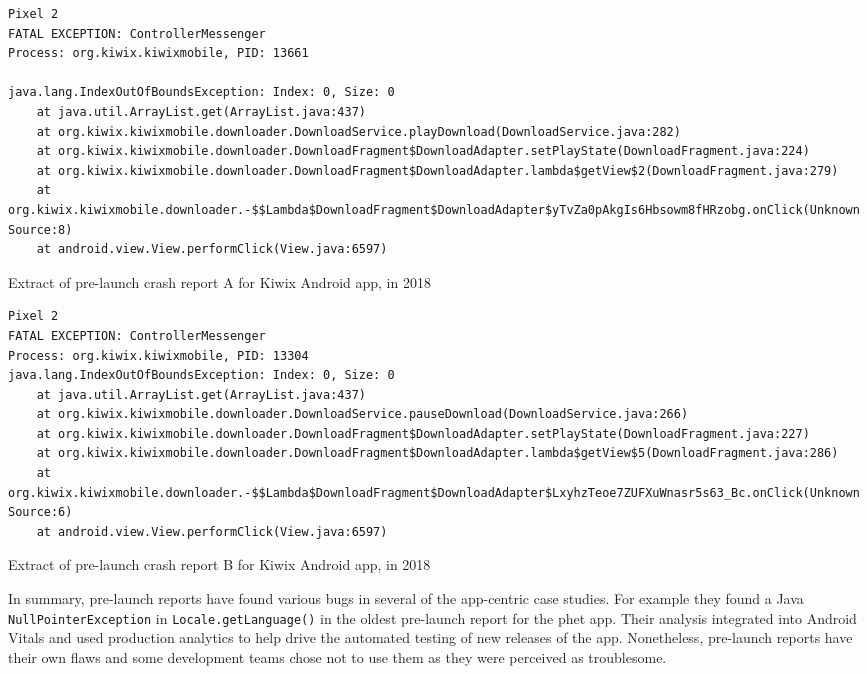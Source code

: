 \begin{listing}
\begin{verbatim}
Pixel 2
FATAL EXCEPTION: ControllerMessenger
Process: org.kiwix.kiwixmobile, PID: 13661

java.lang.IndexOutOfBoundsException: Index: 0, Size: 0
	at java.util.ArrayList.get(ArrayList.java:437)
	at org.kiwix.kiwixmobile.downloader.DownloadService.playDownload(DownloadService.java:282)
	at org.kiwix.kiwixmobile.downloader.DownloadFragment$DownloadAdapter.setPlayState(DownloadFragment.java:224)
	at org.kiwix.kiwixmobile.downloader.DownloadFragment$DownloadAdapter.lambda$getView$2(DownloadFragment.java:279)
	at org.kiwix.kiwixmobile.downloader.-$$Lambda$DownloadFragment$DownloadAdapter$yTvZa0pAkgIs6Hbsowm8fHRzobg.onClick(Unknown Source:8)
	at android.view.View.performClick(View.java:6597)

\end{verbatim}
\caption{Extract of pre-launch crash report A for Kiwix Android app, in 2018}
\label{listing:kiwix-pre-launch-report-crash-report-a}
\end{listing}


\begin{listing}
\begin{verbatim}
Pixel 2
FATAL EXCEPTION: ControllerMessenger
Process: org.kiwix.kiwixmobile, PID: 13304
java.lang.IndexOutOfBoundsException: Index: 0, Size: 0
	at java.util.ArrayList.get(ArrayList.java:437)
	at org.kiwix.kiwixmobile.downloader.DownloadService.pauseDownload(DownloadService.java:266)
	at org.kiwix.kiwixmobile.downloader.DownloadFragment$DownloadAdapter.setPlayState(DownloadFragment.java:227)
	at org.kiwix.kiwixmobile.downloader.DownloadFragment$DownloadAdapter.lambda$getView$5(DownloadFragment.java:286)
	at org.kiwix.kiwixmobile.downloader.-$$Lambda$DownloadFragment$DownloadAdapter$LxyhzTeoe7ZUFXuWnasr5s63_Bc.onClick(Unknown Source:6)
	at android.view.View.performClick(View.java:6597)
\end{verbatim}
\caption{Extract of pre-launch crash report B for Kiwix Android app, in 2018}
\label{listing:kiwix-pre-launch-report-crash-report-b}
\end{listing}

In summary, pre-launch reports have found various bugs in several of the app-centric case studies. For example they found a Java \texttt{NullPointerException} in \texttt{Locale.getLanguage()} in the oldest pre-launch report for the \gls{phet} app. Their analysis integrated into Android Vitals and used production analytics to help drive the automated testing of new releases of the app. Nonetheless, pre-launch reports have their own flaws and some development teams chose not to use them as they were perceived as troublesome. 

